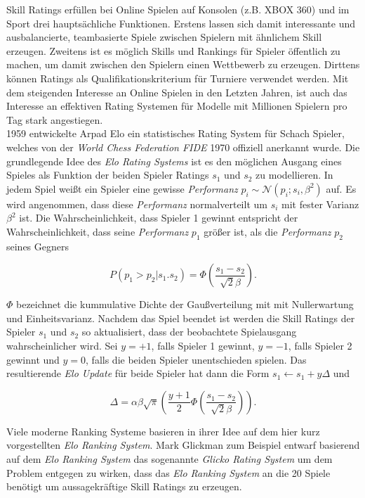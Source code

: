 \documentclass[12pt,a4paper]{scrartcl}
\numberwithin{equation}{section}
\begin{document}
Skill Ratings erfüllen bei Online Spielen auf Konsolen (z.B. XBOX 360) und im Sport drei hauptsächliche Funktionen. Erstens lassen sich damit interessante und ausbalancierte, teambasierte
Spiele zwischen Spielern mit ähnlichem Skill erzeugen. Zweitens ist es möglich Skills und Rankings für Spieler öffentlich zu machen, um damit zwischen den Spielern einen Wettbewerb zu erzeugen. 
Dirttens können Ratings als Qualifikationskriterium für Turniere verwendet werden. 
Mit dem steigenden Interesse an Online Spielen in den Letzten Jahren, ist auch das Interesse an effektiven Rating Systemen für Modelle mit Millionen Spielern pro Tag 
stark angestiegen.\\
1959 entwickelte Arpad Elo ein statistisches Rating System für Schach Spieler, welches von der \textit{World Chess Federation FIDE} 1970 offiziell anerkannt wurde.
Die grundlegende Idee des \textit{Elo Rating Systems} ist es den möglichen Ausgang eines Spieles als Funktion der beiden Spieler Ratings $s_1$ und $s_2$ zu modellieren. 
In jedem Spiel weißt ein Spieler eine gewisse \textit{Performanz} $p_i \sim \mathcal{N}(p_i;s_i,\beta^2)$ auf. Es wird angenommen, dass diese \textit{Performanz} normalverteilt um $s_i$ mit
fester Varianz $\beta^2$ ist. Die Wahrscheinlichkeit, dass Spieler 1 gewinnt entspricht der Wahrscheinlichkeit, dass seine \textit{Performanz} $p_1$ größer ist, als die \textit{Performanz} $p_2$ 
seines Gegners

\begin{equation}
 P(p_1 > p_2 | s_1. s_2) = \varPhi(\frac{s_1 - s_2}{\sqrt{2}\beta}).
\end{equation}

$\varPhi$ bezeichnet die kummulative Dichte der Gaußverteilung mit mit Nullerwartung und Einheitsvarianz.
Nachdem das Spiel beendet ist werden die Skill Ratings der Spieler $s_1$ und $s_2$ so aktualisiert, dass der beobachtete Spielausgang wahrscheinlicher wird. 
Sei $y = +1$, falls Spieler 1 gewinnt, $y = -1$, falls Spieler 2 gewinnt und $y = 0$, falls die beiden Spieler unentschieden spielen. 
Das resultierende \textit{Elo Update} für beide Spieler hat dann die Form $s_1 \leftarrow s_1 + y \Delta$ und 

\begin{equation}
 \Delta = \alpha \beta \sqrt{\pi} (\frac{y+1}{2} \varPhi(\frac{s_1 - s_2}{\sqrt{2} \beta})).
\end{equation}

Viele moderne Ranking Systeme basieren in ihrer Idee auf dem hier kurz vorgestellten \textit{Elo Ranking System}.
Mark Glickman zum Beispiel entwarf basierend auf dem \textit{Elo Ranking System} das sogenannte \textit{Glicko Rating System} um dem  Problem entgegen zu wirken, dass das \textit{Elo Ranking System} an die 20 Spiele
benötigt um aussagekräftige Skill Ratings zu erzeugen. \\
\end{document}
